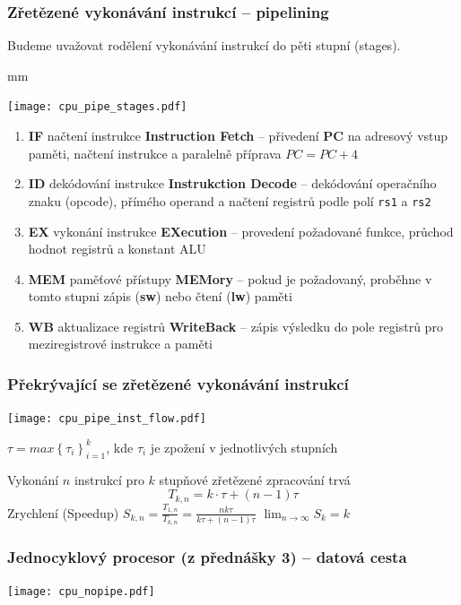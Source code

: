 \documentclass{beamer}
\begin{document}
\begin{frame}
\frametitle{Zřetězené vykonávání instrukcí -- pipelining}

Budeme uvažovat rodělení vykonávání instrukcí do pěti stupní (stages).

 mm

{
\centering
\texttt{[image: cpu\_pipe\_stages.pdf]}
}

\begin{enumerate}
 \item \textbf{IF} načtení instrukce \textbf{Instruction Fetch} -- přivedení \textbf{PC} na adresový vstup paměti, načtení instrukce a paralelně příprava $PC = PC + 4$
 \item \textbf{ID} dekódování instrukce \textbf{Instrukction Decode} -- dekódování operačního znaku (opcode), přímého operand a načtení registrů podle polí \texttt{rs1} a \texttt{rs2}
 \item \textbf{EX} vykonání instrukce \textbf{EXecution} -- provedení požadované funkce, průchod hodnot registrů a konstant ALU
 \item \textbf{MEM} paměťové přístupy \textbf{MEMory} -- pokud je požadovaný, proběhne v tomto stupni zápis (\textbf{sw}) nebo čtení (\textbf{lw}) paměti
 \item \textbf{WB} aktualizace registrů \textbf{WriteBack} -- zápis výsledku do pole registrů pro meziregistrové instrukce a paměti
\end{enumerate}

\end{frame}

\begin{frame}
\frametitle{Překrývající se zřetězené vykonávání instrukcí}
\texttt{[image: cpu\_pipe\_inst\_flow.pdf]}

$\tau = max{\left\lbrace \tau_i \right\rbrace}^k_{i=1}$,  kde $\tau_i$ je zpožení v jednotlivých stupních

Vykonání $n$ instrukcí pro $k$ stupňové zřetězené zpracování trvá
$$T_{k,n} = k \cdot \tau + (n - 1) \tau$$
Zrychlení (Speedup)
\hskip 7mm
$S_{k,n} = \frac{T_{1,n}}{T_{k,n}} = \frac{n k \tau}{k \tau + (n - 1) \tau}$
\hskip 7mm
$\lim_{n \rightarrow \infty} S_k = k$

\end{frame}

\begin{frame}
\frametitle{Jednocyklový procesor (z přednášky 3) -- datová cesta}
\texttt{[image: cpu\_nopipe.pdf]}
\end{frame}
\end{document}
